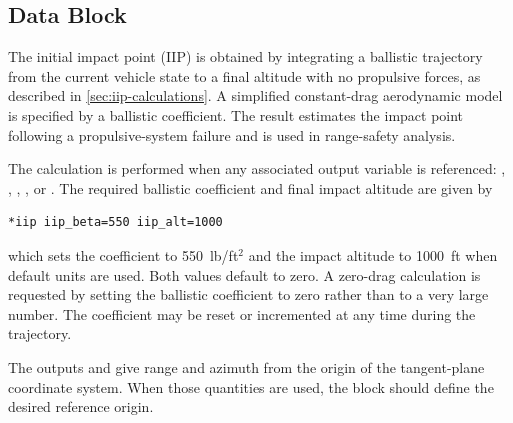 \subsection{ Data Block}\label{sec:block-iip}

The initial impact point (IIP) is obtained by integrating a ballistic trajectory from the
current vehicle state to a final altitude with no propulsive forces, as described in
\cref{sec:iip-calculations}. A simplified constant-drag aerodynamic model is
specified by a ballistic coefficient. The result estimates the impact point following a
propulsive-system failure and is used in range-safety analysis.

The calculation is performed when any associated output variable is referenced:
, , ,
, or . The required ballistic coefficient and
final impact altitude are given by

\begin{lstlisting}[style=taosmanual]
*iip iip_beta=550 iip_alt=1000
\end{lstlisting}

which sets the coefficient to 550~lb/ft$^2$ and the impact altitude to 1000~ft when
default units are used. Both values default to zero. A zero-drag calculation is
requested by setting the ballistic coefficient to zero rather than to a very large
number. The coefficient may be reset or incremented at any time during the
trajectory.

The outputs  and  give range and azimuth from
the origin of the tangent-plane coordinate system. When those quantities are used,
the  block should define the desired reference origin.
